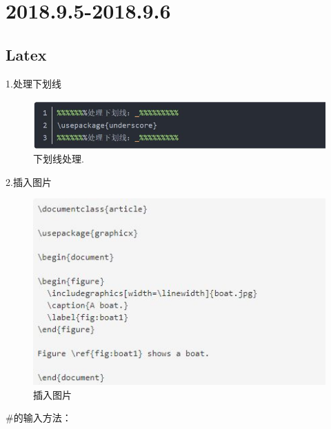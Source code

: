 \documentclass[UTF8]{ctexart}
\begin{document}
\section{2018.9.5-2018.9.6}
\subsection{Latex}
1.处理下划线

\begin{figure}
  \includegraphics[width=.8\linewidth]{a.JPG}
  \caption{下划线处理.}
  \label{fig:boat1}
\end{figure}
2.插入图片
\begin{figure}
  \includegraphics[width=.8\linewidth]{model.JPG}
  \caption{插入图片}
  \label{fig:boat1}
\end{figure}

$\#$的输入方法：
\end{document}
